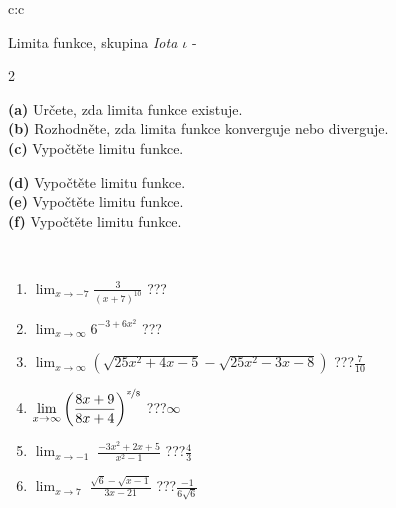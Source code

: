 \documentclass[10pt]{report}
\begin{document}
\begin{tabular}{c:c}
\begin{minipage}[c][104.5mm][t]{0.5\linewidth}
\begin{center}
\vspace{7mm}
{\huge Limita funkce, skupina \textit{Iota $\iota$} -}\\[5mm]
\begin{minipage}{0.95\linewidth}
\begin{center}
{\small \begin{multicols}{2} \raggedright
\textbf{(a)} Určete, zda limita funkce existuje. \\[1mm]
\textbf{(b)} Rozhodněte, zda limita funkce konverguje nebo diverguje. \\[1mm]
\textbf{(c)} Vypočtěte limitu funkce. \par \columnbreak
\textbf{(d)} Vypočtěte limitu funkce. \\[1mm]
\textbf{(e)} Vypočtěte limitu funkce. \\[1mm]
\textbf{(f)} Vypočtěte limitu funkce. \\[1mm]
\end{multicols}
}
\end{center}
\end{minipage}
\\[4mm]
\begin{minipage}{0.79\linewidth}
\begin{center}
\begin{varwidth}{\linewidth}
\begin{enumerate}
\normalsize
\item $\displaystyle\lim_{x\to-7}{\frac{3}{(x+7)^{10}}}$\quad \dotfill\; ???\;\dotfill \quad {}
\item $\displaystyle\lim_{x\to\infty}{6^{-3+6x^2}}$\quad \dotfill\; ???\;\dotfill \quad {}
\item $\displaystyle\lim_{x\to\infty}{\left(\sqrt{25x^2+4x-5} - \sqrt{25x^2-3x-8}\right)}$\quad \dotfill\; ???\;\dotfill \quad $\frac{7}{10}$
\item $\displaystyle\lim_{x\to\infty}{\left( \frac{8x+9}{8x+4} \right)^{\nicefrac{x}{8}}}$\quad \dotfill\; ???\;\dotfill \quad $\infty$
\item $\displaystyle\lim_{x\to -1}{\;\frac{-3x^2+2x+5}{x^2-1}}$\quad \dotfill\; ???\;\dotfill \quad $\frac{4}{3}$
\item $\displaystyle\lim_{x\to 7}{\;\frac{\sqrt{6}-\sqrt{x-1}}{3x-21}}$\quad \dotfill\; ???\;\dotfill \quad $\frac{-1}{6\sqrt{6}}$

\end{enumerate}
\end{varwidth}
\end{center}
\end{minipage}
\end{center}
\end{minipage}
\end{tabular}
\end{document}
